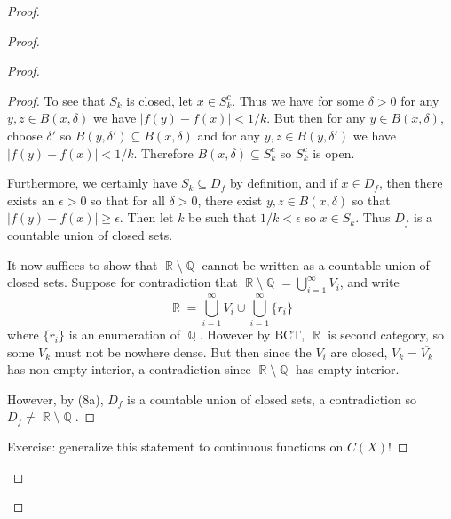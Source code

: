 \documentclass[12pt, a4paper]{book}
\DeclareMathOperator{\Q}{\mathbb{Q}}
\DeclareMathOperator{\R}{\mathbb{R}}
\theoremstyle{nonumberplain}
\newtheorem{proof}{Proof}
\begin{document}
\begin{proof}
\begin{proof}
\begin{proof}
\begin{proof}
    To see that $S_k$ is closed, let $x\in S_k^c$.
    Thus we have for some $\delta>0$ for any  $y,z\in B(x,\delta)$ we have $|f(y)-f(x)|<1/k$.
    But then for any $y\in B(x,\delta)$, choose $\delta'$ so $B(y,\delta')\subseteq B(x,\delta)$ and for any $y,z\in B(y,\delta')$ we have $|f(y)-f(x)|<1/k$.
    Therefore $B(x,\delta)\subseteq S_k^c$ so $S_k^c$ is open.

    Furthermore, we certainly have $S_k\subseteq D_f$ by definition, and if $x\in D_f$, then there exists an $\epsilon>0$ so that for all $\delta>0$, there exist $y,z\in B(x,\delta)$ so that $|f(y)-f(x)|\geq\epsilon$.
    Then let $k$ be such that $1/k<\epsilon$ so $x\in S_k$.
    Thus $D_f$ is a countable union of closed sets.

    It now suffices to show that $\R\setminus\Q$ cannot be written as a countable union of closed sets.
    Suppose for contradiction that $\R\setminus\Q=\bigcup\limits_{i=1}^\infty V_i$, and write
    \[\R=\bigcup\limits_{i=1}^\infty V_i\cup\bigcup\limits_{i=1}^\infty\{r_i\}\]
    where $\{r_i\}$ is an enumeration of $\Q$.
    However by BCT, $\R$ is second category, so some $V_k$ must not be nowhere dense.
    But then since the $V_i$ are closed, $V_k=\overline{V_k}$ has non-empty interior, a contradiction since $\R\setminus\Q$ has empty interior.

    However, by (8a), $D_f$ is a countable union of closed sets, a contradiction so $D_f\neq\R\setminus\Q$.
\end{proof}
Exercise: generalize this statement to continuous functions on $C(X)$!

\end{proof}
\end{proof}
\end{proof}
\end{document}
